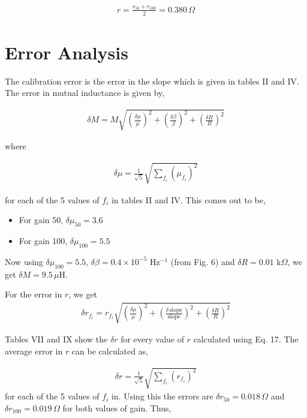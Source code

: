 \begin{align*}
    r = \frac{r_{50}+r_{100}}{2} = 0.380\,\Omega
\end{align*}

\section{Error Analysis}

The calibration error is the error in the slope which
is given in tables II and IV. The error in mutual inductance is given by,

\begin{align}
    \delta M = M\sqrt{\left(\frac{\delta\mu}{\mu}\right)^2 + \left(\frac{\delta\beta}{\beta}\right)^2 + \left(\frac{\delta R}{ R}\right)^2}
\end{align}

where

\begin{align}
    \delta \mu = \frac{1}{\sqrt{5}}\sqrt{\sum_{f_i}\left(\mu_{f_i}\right)^2}
\end{align}

for each of the 5 values of $f_i$ in tables II and IV. This comes out to be,

\begin{itemize}
    \item For gain 50, $\delta \mu_{50} = 3.6$
    \item For gain 100, $\delta \mu_{100} = 5.5$\\
\end{itemize}

Now using $\delta \mu_{100} = 5.5$, $\delta \beta = 0.4 \times 10^{-5}$ Hz$^{-1}$ (from Fig. 6) and $\delta R = 0.01$ k$\Omega$, we get $\delta M = 9.5\,\mu$H.

For the error in $r$, we get
\begin{align}
    \delta r_{f_i} = r_{f_i}\sqrt{\left(\frac{\delta\mu}{\mu}\right)^2 + \left(\frac{\delta\,\text{slope}}{\text{slope}}\right)^2 + \left(\frac{\delta R}{ R}\right)^2}
\end{align}

Tables VII and IX show the $\delta r$ for every value of $r$ calculated using Eq. 17.
The average error in $r$ can be calculated as,

\begin{align}
    \delta r = \frac{1}{\sqrt{5}}\sqrt{\sum_{f_i}\left(r_{f_i}\right)^2}
\end{align}
for each of the 5 values of $f_i$ in. Using this the errors are $\delta r_{50} = 0.018\,\Omega$ and $\delta r_{100} = 0.019\,\Omega$ for both values of gain. Thus,

